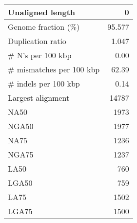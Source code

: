 \documentclass[12pt,a4paper]{article}
\begin{document}
\begin{table}[ht]
\begin{center}
\begin{tabular}{|l*{1}{|r}|}
Unaligned length & 0 \\ \hline
Genome fraction (\%) & 95.577 \\ \hline
Duplication ratio & 1.047 \\ \hline
\# N's per 100 kbp & 0.00 \\ \hline
\# mismatches per 100 kbp & 62.39 \\ \hline
\# indels per 100 kbp & 0.14 \\ \hline
Largest alignment & 14787 \\ \hline
NA50 & 1973 \\ \hline
NGA50 & 1977 \\ \hline
NA75 & 1236 \\ \hline
NGA75 & 1237 \\ \hline
LA50 & 760 \\ \hline
LGA50 & 759 \\ \hline
LA75 & 1502 \\ \hline
LGA75 & 1500 \\ \hline
\end{tabular}
\end{center}
\end{table}
\end{document}
